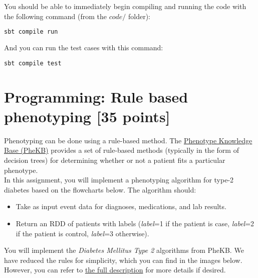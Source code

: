 \documentclass[12pt]{article}
\begin{document}
You should be able to immediately begin compiling and running the code with the following command (from the $code/$ folder):
\begin{lstlisting}[frame=single,language=bash]
sbt compile run
\end{lstlisting}

And you can run the test cases with this command:
\begin{lstlisting}[frame=single,language=bash]
sbt compile test
\end{lstlisting}


\section{Programming: Rule based phenotyping [35 points]}
Phenotyping can be done using a rule-based method. The \href{https://phekb.org}{Phenotype Knowledge Base (PheKB)} provides a set of rule-based methods (typically in the form of decision trees) for determining whether or not a patient fits a particular phenotype. \\

In this assignment, you will implement a phenotyping algorithm for type-2 diabetes based on the flowcharts below. The algorithm should:

\begin{itemize}
\item Take as input event data for diagnoses, medications, and lab results.
\item Return an RDD of patients with labels (\textit{label}=1 if the patient is case, \textit{label}=2 if the patient is control, \textit{label}=3 otherwise). 
\end{itemize}

You will implement the \textit{Diabetes Mellitus Type 2} algorithms from PheKB. We have reduced the rules for simplicity, which you can find in the images below. However, you can refer to \href{http://jamia.oxfordjournals.org/content/19/2/219.long}{the full description} for more details if desired. \\
\end{document}
